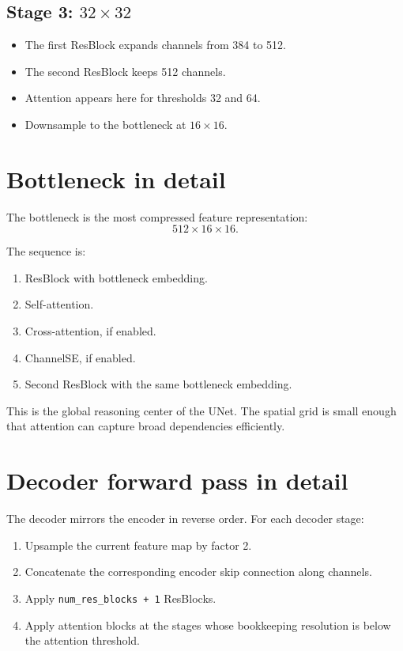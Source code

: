 \documentclass[11pt]{article}
\begin{document}
\subsection{Stage 3: $32 \times 32$}
\begin{itemize}
  \item The first ResBlock expands channels from 384 to 512.
  \item The second ResBlock keeps 512 channels.
  \item Attention appears here for thresholds 32 and 64.
  \item Downsample to the bottleneck at $16 \times 16$.
\end{itemize}

\section{Bottleneck in detail}
The bottleneck is the most compressed feature representation:
\[
512 \times 16 \times 16.
\]

The sequence is:
\begin{enumerate}
  \item ResBlock with bottleneck embedding.
  \item Self-attention.
  \item Cross-attention, if enabled.
  \item ChannelSE, if enabled.
  \item Second ResBlock with the same bottleneck embedding.
\end{enumerate}

This is the global reasoning center of the UNet. The spatial grid is small enough that attention can capture broad dependencies efficiently.

\section{Decoder forward pass in detail}
The decoder mirrors the encoder in reverse order. For each decoder stage:
\begin{enumerate}
  \item Upsample the current feature map by factor 2.
  \item Concatenate the corresponding encoder skip connection along channels.
  \item Apply \texttt{num\_res\_blocks + 1} ResBlocks.
  \item Apply attention blocks at the stages whose bookkeeping resolution is below the attention threshold.
\end{enumerate}
\end{document}
